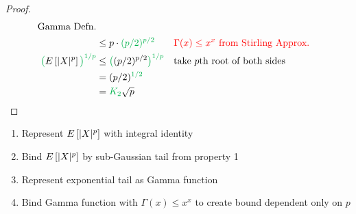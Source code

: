 \begin{proof}
\begin{align*}
            \text{Gamma Defn.} \\ 
        &\leq p \cdot \textcolor{\darkgreen}{(p/2)^{p/2}} &&
            \text{\textcolor{red}{$\Gamma(x) \leq x^x$ from Stirling Approx.}} \\ 
        \textcolor{\darkgreen}{\big(}\Expect{|X|^p}\textcolor{\darkgreen}{\big)^{1/p}} &\leq \textcolor{\darkgreen}{\big(}(p/2)^{p/2}\textcolor{\darkgreen}{\big)^{1/p}} &&
            \text{take $p$th root of both sides} \\ 
        &= (p/2)^{\textcolor{\darkgreen}{1/2}} &&
            \text{} \\ 
        &= \textcolor{\darkgreen}{K_2} \sqrt{p} && 
    \end{align*}
\end{proof}

\begin{tcolorbox}[colback=white!90!gray, title=Proof Technique: Bounding $P$-Norm]
\begin{enumerate}
    \item Represent $E\left[|X|^p \right]$ with integral identity
    \item Bind $E\left[|X|^p \right]$ by sub-Gaussian tail from property 1
    \item Represent exponential tail as Gamma function
    \item Bind Gamma function with $\Gamma(x) \leq x^x$ to create bound dependent only on $p$ 
\end{enumerate}
\end{tcolorbox}


